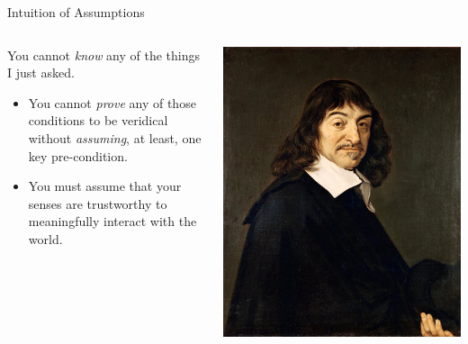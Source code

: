 \documentclass{beamer}\usepackage[]{graphicx}\usepackage[]{color}
\begin{document}
\begin{frame}{Intuition of Assumptions}
  
  \begin{columns}
    \begin{column}{0.5\textwidth}
      
      You cannot \emph{know} any of the things I just asked.
      \vc
      \begin{itemize}
      \item You cannot \emph{prove} any of those conditions to be veridical 
        without \emph{assuming}, at least, one key pre-condition.
        \vc
      \item You must assume that your senses are trustworthy to meaningfully 
        interact with the world.
      \end{itemize}
      
    \end{column}
    \begin{column}{0.5\textwidth}
      
      \includegraphics[width = \textwidth]{figures/descartes.jpg}
      
    \end{column}
  \end{columns}
  
\end{frame}
\end{document}
